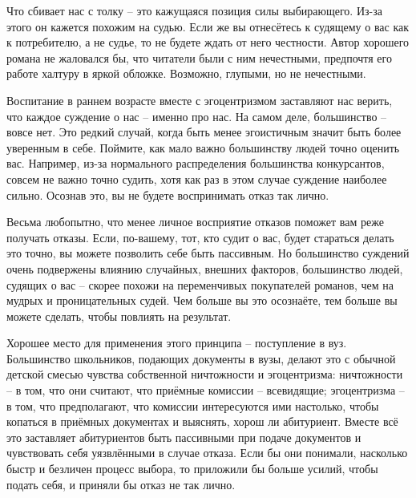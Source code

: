 \documentclass[ebook,12pt,oneside,openany]{memoir}
\begin{document}
Что сбивает нас с толку – это кажущаяся позиция силы выбирающего.
Из-за этого он кажется похожим на судью. Если же вы отнесётесь к
судящему о вас как к потребителю, а не судье, то не будете ждать от
него честности. Автор хорошего романа не жаловался бы, что читатели
были с ним нечестными, предпочтя его работе халтуру в яркой обложке.
Возможно, глупыми, но не нечестными.

Воспитание в раннем возрасте вместе с эгоцентризмом заставляют нас
верить, что каждое суждение о нас – именно про нас. На самом деле,
большинство – вовсе нет. Это редкий случай, когда быть менее
эгоистичным значит быть более уверенным в себе. Поймите, как мало
важно большинству людей точно оценить вас. Например, из-за нормального
распределения большинства конкурсантов, совсем не важно точно судить,
хотя как раз в этом случае суждение наиболее сильно. Осознав это, вы
не будете воспринимать отказ так лично.

Весьма любопытно, что менее личное восприятие отказов поможет вам реже
получать отказы. Если, по-вашему, тот, кто судит о вас, будет
стараться делать это точно, вы можете позволить себе быть пассивным.
Но большинство суждений очень подвержены влиянию случайных, внешних
факторов, большинство людей, судящих о вас – скорее похожи на
переменчивых покупателей романов, чем на мудрых и проницательных
судей. Чем больше вы это осознаёте, тем больше вы можете сделать,
чтобы повлиять на результат.

Хорошее место для применения этого принципа – поступление в вуз.
Большинство школьников, подающих документы в вузы, делают это с
обычной детской смесью чувства собственной ничтожности и эгоцентризма:
ничтожности – в том, что они считают, что приёмные комиссии –
всевидящие; эгоцентризма – в том, что предполагают, что комиссии
интересуются ими настолько, чтобы копаться в приёмных документах и
выяснять, хорош ли абитуриент. Вместе всё это заставляет абитуриентов
быть пассивными при подаче документов и чувствовать себя уязвлёнными в
случае отказа. Если бы они понимали, насколько быстр и безличен
процесс выбора, то приложили бы больше усилий, чтобы подать себя, и
приняли бы отказ не так лично.
\end{document}
